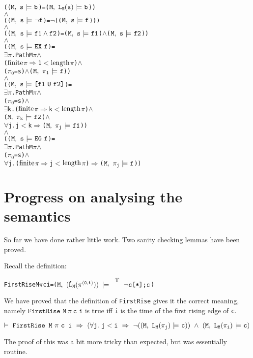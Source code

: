 \documentclass{llncs}
\newcommand{\And}{\(\wedge\)}
\newcommand{\Imp}{\(\Rightarrow\)}
\newcommand{\Not}{\(\neg\)}
\newcommand{\Forall}{\(\forall\)}
\newcommand{\Exists}{\(\exists\)}
\newcommand{\IsFinitePath}{\({\rm{finite}}\)}
\newcommand{\PathLength}{\({\rm{length}}\)}
\newcommand{\Le}{\(<\)}
\newcommand{\T}{\texttt{\small\rm{T}}}
\newcommand{\bTrue}{\T}
\renewcommand{\Pi}{\(\pi\)}
\newcommand{\BSem}[3]{(\(\tt#1,~#2~{\models}~#3\))}
\newcommand{\bSem}[3]{(\tt#1,~#2~{\models}~#3)}
\newcommand{\SSem}[4]{(\(\tt{#1,~#2~\models^{\hspace*{-2.3mm}\raisebox{1mm}{\tt#3}}~#4}\))}
\newcommand{\OSem}[3]{(\(\tt{#1,~#2~{\models}~#3}\))}
\newcommand{\bNot}[1]{\neg#1}
\newcommand{\pathEl}[2]{#1_{#2}}
\newcommand{\PathEl}[2]{\(#1_{#2}\)}
\newcommand{\pathSeg}[2]{#1^{#2}}
\newcommand{\lHat}[1]{\hat{\texttt{L}}_{#1}}
\newcommand{\lNoHat}[1]{{\texttt{L}}_{#1}}
\newcommand{\sBool}[1]{#1}
\newcommand{\oBool}[1]{#1}
\newcommand{\oNot}[1]{\neg#1}
\newcommand{\sRepeat}[1]{#1\texttt{[*]}}
\newcommand{\sCat}[2]{#1\texttt{;}#2}
\newcommand{\oAnd}[2]{#1\wedge#2}
\newcommand{\oEx}[1]{{\texttt{EX}}~#1}
\newcommand{\oEg}[1]{{\texttt{EG}}~#1}
\newcommand{\oEu}[2]{\texttt{[}#1~{\texttt{U}}~#2\texttt{]}}
\renewcommand{\t}[1]{\texttt{#1}}
\begin{document}
{\begin{alltt}
   (\OSem{M}{s}{\oBool{b}} = {\BSem{M}{\lNoHat{M}(s)}{b}})
   {\And}
   (\OSem{M}{s}{\oNot{f}} = {\Not}(\OSem{M}{s}{f})) 
   {\And}
   (\OSem{M}{s}{\oAnd{f1}{f2}} = \OSem{M}{s}{f1} {\And} \OSem{M}{s}{f2})
   {\And}
   (\OSem{M}{s}{\oEx{f}} = 
     {\Exists}{\Pi}. Path M {\Pi}                 {\And} 
         ({\IsFinitePath} {\Pi} {\Imp} 1 {\Le} \PathLength {\Pi}) {\And} 
         (\PathEl{{\pi}}{0} = s) {\And} \OSem{M}{\pathEl{{\pi}}{1}}{f})
   {\And}
   (\OSem{M}{s}{\oEu{f1}{f2}} = 
     {\Exists}{\Pi}. Path M {\Pi}                    {\And} 
         (\PathEl{{\pi}}{0} = s)                     {\And} 
         {\Exists}k. ({\IsFinitePath} {\Pi} {\Imp} k {\Le} \PathLength {\Pi}) {\And}
             \OSem{M}{\pathEl{{\pi}}{k}}{f2}             {\And} 
             {\Forall}j. j {\Le} k {\Imp} \OSem{M}{\pathEl{{\pi}}{j}}{f1})
   {\And}
   (\OSem{M}{s}{\oEg{f}} = 
     {\Exists}{\Pi}. Path M {\Pi} {\And} 
         (\PathEl{{\pi}}{0} = s)  {\And} 
         {\Forall}j. ({\IsFinitePath} {\Pi} {\Imp} j {\Le} \PathLength {\Pi}) {\Imp} \OSem{M}{\pathEl{{\pi}}{j}}{f})
\end{alltt}}

\section{Progress on analysing the semantics}\label{progress}

So far we have done rather little work. Two sanity checking lemmas have been proved.

Recall the definition:


{\begin{alltt}
   FirstRise M {\Pi} c i    = \SSem{M}{(\lHat{M} (\pathSeg{\pi}{(0,i)}))}{\bTrue}{\sCat{\sRepeat{\sBool{\bNot{c}}}}{\sBool{c}}}
\end{alltt}}

We have proved that the definition of \t{FirstRise} gives it the correct meaning,
namely $\t{FirstRise~M}~{\pi}~\t{c~i}$ is true iff \t{i} is the time of the first
rising edge of \t{c}.

\medskip

$\vdash~ \t{FirstRise~M}~{\pi}~\t{c~i}~\Rightarrow~(\forall \t{j}.~\t{j} < \t{i} ~\Rightarrow~
\neg(\bSem{M}{L_{M}(\pi_j)}{\t{c}})~\wedge~\bSem{M}{L_{M}(\pi_i)}{\t{c}}$

\medskip

The proof of this was a bit more tricky than expected, but was essentially routine.
\end{document}
